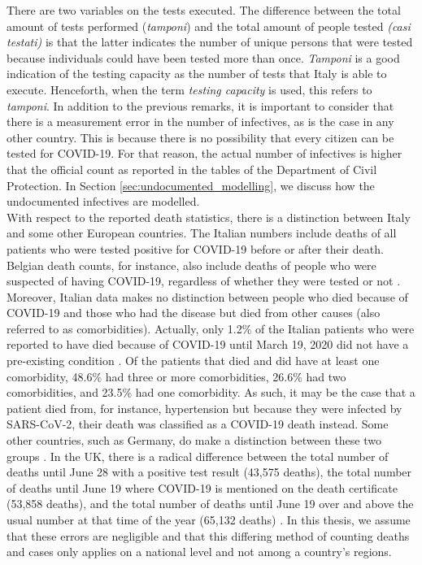 \documentclass[12pt]{article}
\begin{document}
	There are two variables on the tests executed. The difference between the total amount of tests performed (\textit{tamponi}) and the total amount of people tested \textit{(casi testati)} is that the latter indicates the number of unique persons that were tested because individuals could have been tested more than once. \textit{Tamponi} is a good indication of the testing capacity as the number of tests that Italy is able to execute. Henceforth, when the term \textit{testing capacity} is used, this refers to \textit{tamponi}. In addition to the previous remarks, it is important to consider that there is a measurement error in the number of infectives, as is the case in any other country. This is because there is no possibility that every citizen can be tested for COVID-19. For that reason, the actual number of infectives is higher that the official count as reported in the tables of the Department of Civil Protection. In Section \ref{sec:undocumented_modelling}, we discuss how the undocumented infectives are modelled. \\
	
	With respect to the reported death statistics, there is a distinction between Italy and some other European countries. The Italian numbers include deaths of all patients who were tested positive for COVID-19 before or after their death. Belgian death counts, for instance, also include deaths of people who were suspected of having COVID-19, regardless of whether they were tested or not \parencite{schultz2020belgiumDeathRate}. Moreover, Italian data makes no distinction between people who died because of COVID-19 and those who had the disease but died from other causes (also referred to as comorbidities). Actually, only 1.2\% of the Italian patients who were reported to have died because of COVID-19 until March 19, 2020 did not have a pre-existing condition \parencite{ecdc2020riskassessment}. Of the patients that died and did have at least one comorbidity, 48.6\% had three or more comorbidities, 26.6\% had two comorbidities, and 23.5\% had one comorbidity. As such, it may be the case that a patient died from, for instance, hypertension but because they were infected by SARS-CoV-2, their death was classified as a COVID-19 death instead. Some other countries, such as Germany, do make a distinction between these two groups \parencite{otherCountriesDeathsCaccia}. In the UK, there is a radical difference between the total number of deaths until June 28 with a positive test result (43,575 deaths), the total number of deaths until June 19 where COVID-19 is mentioned on the death certificate (53,858 deaths), and the total number of deaths until June 19 over and above the usual number at that time of the year (65,132 deaths) \parencite{bbc2020deathrate}. In this thesis, we assume that these errors are negligible and that this differing method of counting deaths and cases only applies on a national level and not among a country's regions. \\
	
\end{document}
